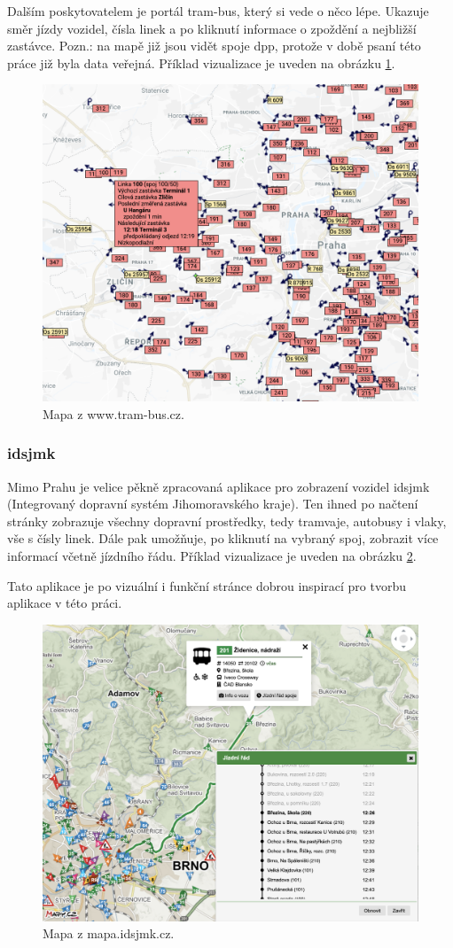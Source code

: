 Dalším poskytovatelem je portál tram-bus, který si vede o něco lépe. Ukazuje směr jízdy vozidel, čísla linek a po kliknutí informace o zpoždění a nejbližší zastávce. Pozn.: na mapě již jsou vidět spoje \gls{dpp}, protože v době psaní této práce již byla data veřejná. Příklad vizualizace je uveden na obrázku \ref{fig:tram-bus_result}.

\begin{figure}
	\centering
  \includegraphics[width=0.5\linewidth]{../img/tram-bus_mapa.png}
  \caption{Mapa z www.tram-bus.cz.}
  \label{fig:tram-bus_result}
\end{figure}

\subsubsection{\gls{idsjmk}}

Mimo Prahu je velice pěkně zpracovaná aplikace pro zobrazení vozidel \gls{idsjmk} (Integrovaný dopravní systém Jihomoravského kraje). Ten ihned po načtení stránky zobrazuje všechny dopravní prostředky, tedy tramvaje, autobusy i vlaky, vše s čísly linek. Dále pak umožňuje, po kliknutí na vybraný spoj, zobrazit více informací včetně jízdního řádu. Příklad vizualizace je uveden na obrázku \ref{fig:idsjmk_result}.

\bigbreak

Tato aplikace je po vizuální i funkční stránce dobrou inspirací pro tvorbu aplikace v této práci.

\begin{figure}
	\centering
  \includegraphics[width=0.5\linewidth]{../img/idsjmk_mapa.png}
  \caption{Mapa z mapa.idsjmk.cz.}
  \label{fig:idsjmk_result}
\end{figure}

